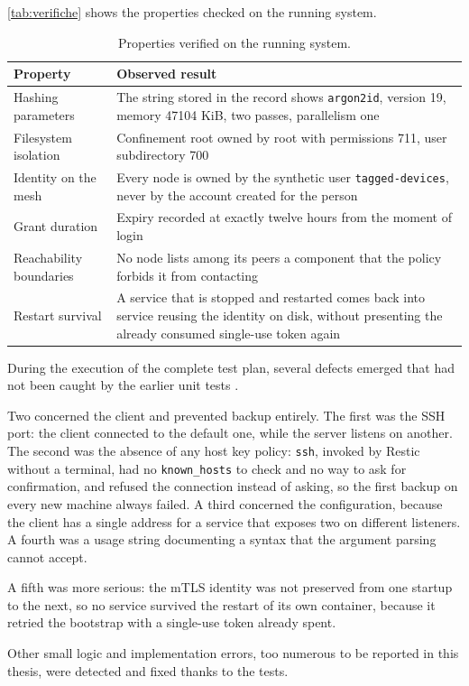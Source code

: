 \autoref{tab:verifiche} shows the properties checked on the running system.

\begin{table}[H]
\centering
\caption{Properties verified on the running system.}
\label{tab:verifiche}
\begin{tabular}{@{}p{} p{}@{}}
\hline
\textbf{Property} & \textbf{Observed result} \\
\hline
Hashing parameters & The string stored in the record shows \texttt{argon2id}, version 19,
memory 47104 KiB, two passes, parallelism one \\
Filesystem isolation & Confinement root owned by root with permissions 711,
user subdirectory 700 \\
Identity on the mesh & Every node is owned by the synthetic user
\texttt{tagged-devices}, never by the account created for the person \\
Grant duration & Expiry recorded at exactly twelve hours from the moment of login \\
Reachability boundaries & No node lists among its peers a component that the
policy forbids it from contacting \\
Restart survival & A service that is stopped and restarted comes back into service reusing
the identity on disk, without presenting the already consumed single-use token again \\
\hline
\end{tabular}
\end{table}

During the execution of the complete test plan, several defects emerged that had not been
caught by the earlier unit tests \cite{ramusb-known-issues}.

Two concerned the client and prevented backup entirely. The first was the SSH port: the client
connected to the default one, while the server listens on another. The second was the absence of
any host key policy: \texttt{ssh}, invoked by Restic without a terminal, had no
\texttt{known\_hosts} to check and no way to ask for confirmation, and refused the connection instead of
asking, so the first backup on every new machine always failed. A third concerned the configuration,
because the client has a single address for a service that exposes two on different listeners. A
fourth was a usage string documenting a syntax that the argument parsing cannot accept.

A fifth was more serious: the mTLS identity was not preserved from one startup to the next, so
no service survived the restart of its own container, because it retried the bootstrap with a
single-use token already spent.

Other small logic and implementation errors, too numerous to be reported in this thesis,
were detected and fixed thanks to the tests.
